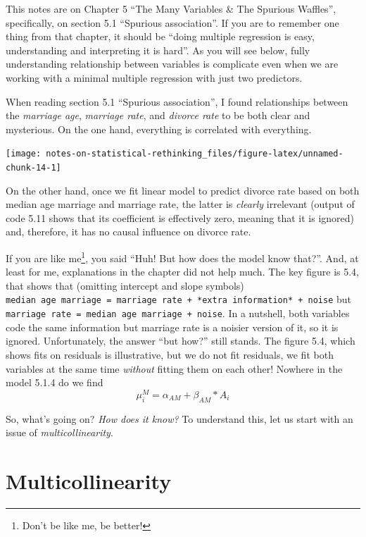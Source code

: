 \documentclass[
]{book}
\begin{document}
This notes are on Chapter 5 ``The Many Variables \& The Spurious Waffles'', specifically, on section 5.1 ``Spurious association''. If you are to remember one thing from that chapter, it should be ``doing multiple regression is easy, understanding and interpreting it is hard''. As you will see below, fully understanding relationship between variables is complicate even when we are working with a minimal multiple regression with just two predictors.

When reading section 5.1 ``Spurious association'', I found relationships between the \emph{marriage age}, \emph{marriage rate}, and \emph{divorce rate} to be both clear and mysterious. On the one hand, everything is correlated with everything.

\begin{center}\texttt{[image: notes-on-statistical-rethinking\_files/figure-latex/unnamed-chunk-14-1]} \end{center}

On the other hand, once we fit linear model to predict divorce rate based on both median age marriage and marriage rate, the latter is \emph{clearly} irrelevant (output of code 5.11 shows that its coefficient is effectively zero, meaning that it is ignored) and, therefore, it has no causal influence on divorce rate.

If you are like me\footnote{Don't be like me, be better!}, you said ``Huh! But how does the model know that?''. And, at least for me, explanations in the chapter did not help much. The key figure is 5.4, that shows that (omitting intercept and slope symbols) \texttt{median\ age\ marriage\ =\ marriage\ rate\ +\ *extra\ information*\ +\ noise} but \texttt{marriage\ rate\ =\ median\ age\ marriage\ +\ noise}. In a nutshell, both variables code the same information but marriage rate is a noisier version of it, so it is ignored. Unfortunately, the answer ``but how?'' still stands. The figure 5.4, which shows fits on residuals is illustrative, but we do not fit residuals, we fit both variables at the same time \emph{without} fitting them on each other! Nowhere in the model 5.1.4 do we find \[\mu^{M}_{i} = \alpha_{AM} + \beta_{AM} * A_i\]

So, what's going on? \emph{How does it know?} To understand this, let us start with an issue of \emph{multicollinearity}.

\hypertarget{multicollinearity}{%
\section{Multicollinearity}\label{multicollinearity}}
\end{document}
